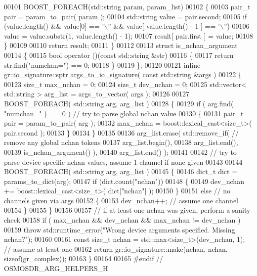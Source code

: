 \begin{DoxyCode}
00101   BOOST\_FOREACH(std::string param, param\_list)
00102   \{
00103     pair_t pair = param_to_pair( param );
00104     std::string value = pair.second;
00105     \textcolor{keywordflow}{if} (value.length() && value[0] == \textcolor{charliteral}{'\(\backslash\)''} && value[ value.length() - 1 ] == \textcolor{charliteral}{'\(\backslash\)''})
00106       value = value.substr(1, value.length() - 1);
00107     result[ pair.first ] = value;
00108   \}
00109 
00110   \textcolor{keywordflow}{return} result;
00111 \}
00112 
00113 \textcolor{keyword}{struct }is_nchan_argument
00114 \{
00115   \textcolor{keywordtype}{bool} operator ()(\textcolor{keyword}{const} std::string &str)
00116   \{
00117     \textcolor{keywordflow}{return} str.find(\textcolor{stringliteral}{"numchan="}) == 0;
00118   \}
00119 \};
00120 
00121 \textcolor{keyword}{inline} gr::io\_signature::sptr args_to_io_signature( \textcolor{keyword}{const} std::string &args )
00122 \{
00123   \textcolor{keywordtype}{size\_t} max\_nchan = 0;
00124   \textcolor{keywordtype}{size\_t} dev\_nchan = 0;
00125   std::vector< std::string > arg\_list = args_to_vector( args );
00126 
00127   BOOST\_FOREACH( std::string arg, arg\_list )
00128   \{
00129     \textcolor{keywordflow}{if} ( arg.find( \textcolor{stringliteral}{"numchan="} ) == 0 ) \textcolor{comment}{// try to parse global nchan value}
00130     \{
00131       pair_t pair = param_to_pair( arg );
00132       max\_nchan = boost::lexical\_cast<\textcolor{keywordtype}{size\_t}>( pair.second );
00133     \}
00134   \}
00135 
00136   arg\_list.erase( std::remove\_if( \textcolor{comment}{// remove any global nchan tokens}
00137                     arg\_list.begin(),
00138                     arg\_list.end(),
00139                     is_nchan_argument() ),
00140                   arg\_list.end() );
00141 
00142   \textcolor{comment}{// try to parse device specific nchan values, assume 1 channel if none given}
00143 
00144   BOOST\_FOREACH( std::string arg, arg\_list )
00145   \{
00146     dict_t dict = params_to_dict(arg);
00147     \textcolor{keywordflow}{if} (dict.count(\textcolor{stringliteral}{"nchan"}))
00148     \{
00149       dev\_nchan += boost::lexical\_cast<\textcolor{keywordtype}{size\_t}>( dict[\textcolor{stringliteral}{"nchan"}] );
00150     \}
00151     \textcolor{keywordflow}{else} \textcolor{comment}{// no channels given via args}
00152     \{
00153       dev\_nchan++; \textcolor{comment}{// assume one channel}
00154     \}
00155   \}
00156 
00157   \textcolor{comment}{// if at least one nchan was given, perform a sanity check}
00158   \textcolor{keywordflow}{if} ( max\_nchan && dev\_nchan && max\_nchan != dev\_nchan )
00159     \textcolor{keywordflow}{throw} std::runtime\_error(\textcolor{stringliteral}{"Wrong device arguments specified. Missing nchan?"});
00160 
00161   \textcolor{keyword}{const} \textcolor{keywordtype}{size\_t} nchan = std::max<size\_t>(dev\_nchan, 1); \textcolor{comment}{// assume at least one}
00162   \textcolor{keywordflow}{return} gr::io\_signature::make(nchan, nchan, \textcolor{keyword}{sizeof}(gr\_complex));
00163 \}
00164 
00165 \textcolor{preprocessor}{#endif // OSMOSDR\_ARG\_HELPERS\_H}
\end{DoxyCode}
